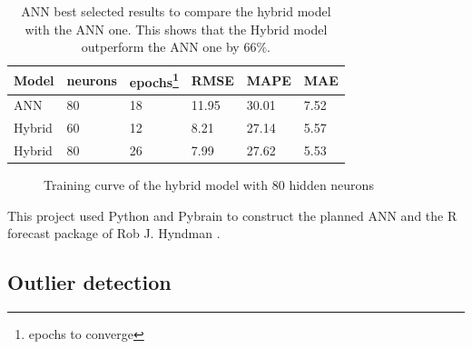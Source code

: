 \documentclass{sig-alternate-sigmod07}
\begin{document}
\begin{table}
\centering
\caption{ANN best selected results to compare the hybrid model with the ANN one. This shows that the Hybrid model outperform the ANN one by $66\%$.}
\label{tab:ANNresults}
\begin{tabular}{llllll} \hline
Model			& neurons & epochs\footnote{epochs to converge} & RMSE & MAPE & MAE \\ \hline
ANN 				& 80 & 18 & 11.95 & 30.01  & 7.52 \\ 
Hybrid			& 60 &  12 & 8.21 & 27.14 & 5.57 \\ 
Hybrid			& 80 & 26 & 7.99 & 27.62 & 5.53 \\ 
\hline
\end{tabular}
\end{table}
\begin{figure}
\centering
{}
\caption{Training curve of the hybrid model with 80 hidden neurons}
\end{figure}
This project used Python and Pybrain \cite{schaul2010} to construct the planned ANN and the R forecast package of Rob J. Hyndman \cite{hyndman2007automatic}. 

\subsection{Outlier detection}
\end{document}
